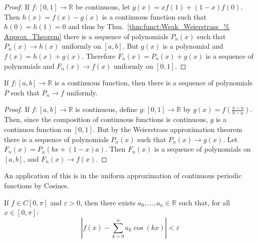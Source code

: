             \begin{proof}
                If $f:[0,1]\rightarrow\mathbb{R}$ be
                continuous, let
                $g(x)=xf(1)+(1-x)f(0)$. Then
                $h(x)=f(x)-g(x)$ is a continuous function
                such that $h(0)=h(1)=0$ and thus by
                Thm.~\ref{thm:funct:Weak_Weierstrass_%
                          Approx_Theorem}
                there is a sequence of polynomials
                $P_{n}(x)$ such that
                $P_{n}(x)\rightarrow{h(x)}$
                uniformly on $[a,b]$.
                But $g(x)$ is a polynomial and
                $f(x)=h(x)+g(x)$. Therefore
                $F_{n}(x)=P_{n}(x)+g(x)$ is a sequence
                of polynomials and
                $F_{n}(x)\rightarrow{f(x)}$
                uniformly on $[0,1]$.
            \end{proof}
            \begin{theorem}
                If $f:[a,b]\rightarrow\mathbb{R}$ is a
                continuous function, then there is a sequence
                of polynomials $P$ such that
                $P_{n}\rightarrow{f}$ uniformly.
            \end{theorem}
            \begin{proof}
                If $f:[a,b]\rightarrow\mathbb{R}$ is
                continuous, define
                $g:[0,1]\rightarrow\mathbb{R}$ by
                $g(x)=f(\frac{x-a}{b-a})$. Then, since
                the composition of continuous functions
                is continuous, $g$ is a continuou function
                on $[0,1]$. But by the Weierstrass
                approximation theorem there is a sequence
                of polynomials $P_{n}(x)$ such that
                $P_{n}(x)\rightarrow{g(x)}$. Let
                $F_{n}(x)=P_{n}(bx+(1-x)a)$. Then
                $F_{n}(x)$ is a sequence of polynomials
                on $[a,b]$, and $F_{n}(x)\rightarrow{f(x)}$.
            \end{proof}
            An application of this is in the uniform
            approximation of continuous periodic functions
            by Cosines.
        \begin{theorem}
            If $f\in{C[0,\pi]}$ and $\varepsilon>0$,
            then there exists
            $a_{0},\hdots,a_{n}\in\mathbb{R}$ such that, for all
            $x\in[0,\pi]$:
            \begin{equation}
                |f(x)-\sum_{k=0}^{n}a_{k}\cos(kx)|
                <\varepsilon
            \end{equation}
        \end{theorem}
